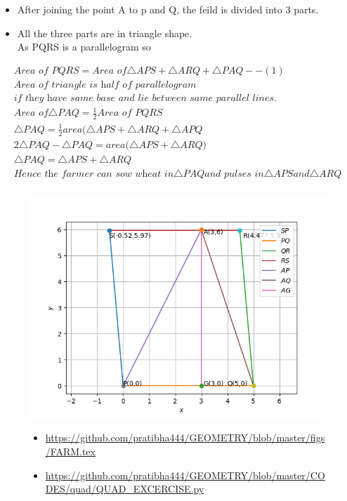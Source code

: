 \begin{frame}
\begin{itemize}
\item  After joining the point A to p and Q, the feild is divided into 3 parts.\\
\item All the three parts are in triangle shape.\\
As PQRS is a parallelogram so\\
\end{itemize}
\begin{align*}
\textit{Area of PQRS} = \textit{Area of} \triangle{APS} + \triangle{ARQ} + \triangle{PAQ} --(1)\\
\textit{Area of triangle is half of parallelogram}\\\textit{if they have same base and lie between same parallel lines}. \\
\textit{Area of} \triangle{PAQ} = \frac{1}{2} \textit{Area of PQRS}\\
\triangle{PAQ} = \frac{1}{2}\textit{area}(\triangle{APS} + \triangle{ARQ} + \triangle{APQ}\\
2\triangle{PAQ} - \triangle{PAQ} = \textit{area(}\triangle{APS} + \triangle{ARQ}\textit{)}\\
\triangle{PAQ} = \triangle{APS} + \triangle{ARQ}\\
\textit{Hence the farmer can sow wheat in} \triangle{PAQ} \textit{and pulses in} \triangle{APS} and \triangle{ARQ}\\
\end{align*}
\end{frame}
\begin{frame}
\begin{figure}
\includegraphics[scale=.5]{./CODES/quad/NEWQUAD.png}\\
\begin{itemize}
\item \url{https://github.com/pratibha444/GEOMETRY/blob/master/figs/FARM.tex}\\
\item \url{https://github.com/pratibha444/GEOMETRY/blob/master/CODES/quad/QUAD_EXCERCISE.py}
\end{itemize}
\seti
\end{figure}
\end{frame}
